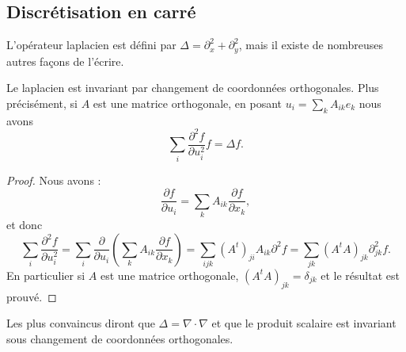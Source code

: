 \subsection{Discrétisation en carré}

L'opérateur laplacien est défini par \( \Delta=\partial_x^2+\partial_y^2\), mais il existe de nombreuses autres façons de l'écrire.

\begin{lemma}
	Le laplacien est invariant par changement de coordonnées orthogonales. Plus précisément, si \( A\) est une matrice orthogonale, en posant \( u_i=\sum_kA_{ik}e_k\) nous avons
	\begin{equation}
		\sum_i\frac{ \partial^2f }{ \partial u_i^2 }f=\Delta f.
	\end{equation}
\end{lemma}

\begin{proof}
	Nous avons :
	\begin{equation}
		\frac{ \partial f }{ \partial u_i }=\sum_kA_{ik}\frac{ \partial f }{ \partial x_k },
	\end{equation}
	et donc
	\begin{equation}
		\sum_i\frac{ \partial^2f }{ \partial u_i^2 }=\sum_i\frac{ \partial  }{ \partial u_i }\left( \sum_kA_{ik}\frac{ \partial f }{ \partial x_k } \right)=\sum_{ijk}(A^t)_{ji}A_{ik}\partial^2f=\sum_{jk}(A^tA)_{jk}\partial^2_{jk}f.
	\end{equation}
	En particulier si \( A\) est une matrice orthogonale, \( (A^tA)_{jk}=\delta_{jk}\) et le résultat est prouvé.
\end{proof}

Les plus convaincus diront que \( \Delta=\nabla\cdot\nabla\) et que le produit scalaire est invariant sous changement de coordonnées orthogonales.

